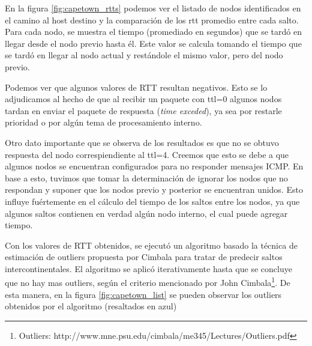 \par En la figura \ref{fig:capetown_rtts} podemos ver el listado de nodos identificados en el camino al host destino y la comparación de los rtt promedio entre cada salto. Para cada nodo, se muestra el tiempo (promediado en segundos) que se tardó en llegar desde el nodo previo hasta él. Este valor se calcula tomando el tiempo que se tardó en llegar al nodo actual y restándole el mismo valor, pero del nodo previo.
\par Podemos ver que algunos valores de RTT resultan negativos. Esto se lo adjudicamos al hecho de que al recibir un paquete con ttl=0 algunos nodos tardan en enviar el paquete de respuesta (\textit{time exceded}), ya sea por restarle prioridad o por algún tema de procesamiento interno.
\par Otro dato importante que se observa de los resultados es que no se obtuvo respuesta del nodo correspiendiente al ttl=4. Creemos que esto se debe a que algunos nodos se encuentran configurados para no responder mensajes ICMP. En base a esto, tuvimos que tomar la determinación de ignorar los nodos que no respondan y suponer que los nodos previo y posterior se encuentran unidos. Esto influye fuértemente en el cálculo del tiempo de los saltos entre los nodos, ya que algunos saltos contienen en verdad algún nodo interno, el cual puede agregar tiempo.
\par Con los valores de RTT obtenidos, se ejecutó un algoritmo basado la técnica de estimación de outliers propuesta por Cimbala para tratar de predecir saltos intercontinentales. El algoritmo se aplicó iterativamente hasta que se concluye que no hay mas outliers, según el criterio mencionado por John Cimbala\footnote{Outliers: http://www.mne.psu.edu/cimbala/me345/Lectures/Outliers.pdf}. De esta manera, en la figura \ref{fig:capetown_list} se pueden observar los outliers obtenidos por el algoritmo (resaltados en azul)

